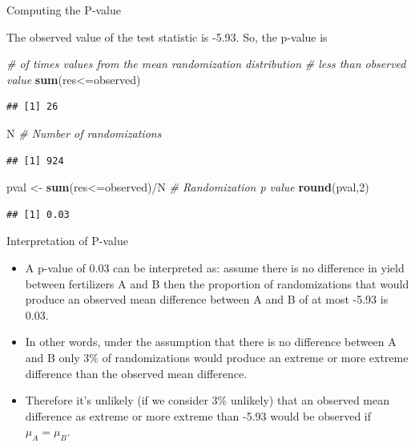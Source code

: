 \documentclass[9pt,ignorenonframetext,]{beamer}
\newenvironment{Shaded}{\begin{snugshade}}{\end{snugshade}}
\newcommand{\KeywordTok}[1]{\textcolor[rgb]{0.13,0.29,0.53}{\textbf{{#1}}}}
\newcommand{\DecValTok}[1]{\textcolor[rgb]{0.00,0.00,0.81}{{#1}}}
\newcommand{\StringTok}[1]{\textcolor[rgb]{0.31,0.60,0.02}{{#1}}}
\newcommand{\CommentTok}[1]{\textcolor[rgb]{0.56,0.35,0.01}{\textit{{#1}}}}
\newcommand{\NormalTok}[1]{{#1}}
\begin{document}
\begin{frame}[fragile]{Computing the P-value}

The observed value of the test statistic is -5.93. So, the p-value is

\begin{Shaded}
\begin{Highlighting}[]
\CommentTok{# of times values from the mean randomization distribution }
\CommentTok{# less than observed value}
\KeywordTok{sum}\NormalTok{(res<=observed) }
\end{Highlighting}
\end{Shaded}

\begin{verbatim}
## [1] 26
\end{verbatim}

\begin{Shaded}
\begin{Highlighting}[]
\NormalTok{N }\CommentTok{# Number of randomizations}
\end{Highlighting}
\end{Shaded}

\begin{verbatim}
## [1] 924
\end{verbatim}

\begin{Shaded}
\begin{Highlighting}[]
\NormalTok{pval <-}\StringTok{ }\KeywordTok{sum}\NormalTok{(res<=observed)/N }\CommentTok{# Randomization p value}
\KeywordTok{round}\NormalTok{(pval,}\DecValTok{2}\NormalTok{)}
\end{Highlighting}
\end{Shaded}

\begin{verbatim}
## [1] 0.03
\end{verbatim}

\end{frame}

\begin{frame}{Interpretation of P-value}

\begin{itemize}
\item
  A p-value of 0.03 can be interpreted as: assume there is no difference
  in yield between fertilizers A and B then the proportion of
  randomizations that would produce an observed mean difference between
  A and B of at most -5.93 is 0.03.
\item
  In other words, under the assumption that there is no difference
  between A and B only 3\% of randomizations would produce an extreme or
  more extreme difference than the observed mean difference.
\item
  Therefore it's unlikely (if we consider 3\% unlikely) that an observed
  mean difference as extreme or more extreme than -5.93 would be
  observed if \(\mu_A=\mu_B\).
\end{itemize}

\end{frame}
\end{document}
